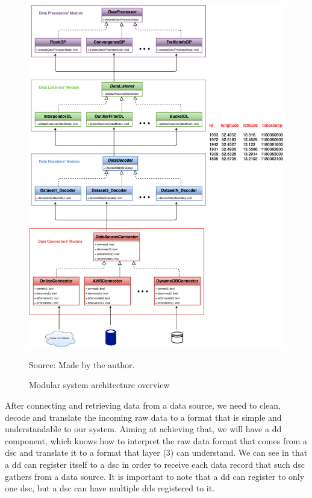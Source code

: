 \begin{figure}[h!]
    \centering
    \caption{Modular system architecture overview}
    \centerline{\includegraphics[width=\linewidth]{images/architecture.eps}}
    \footnotesize{Source: Made by the author.}
    \label{fig:architecture}
\end{figure}

After connecting and retrieving data from a data source, we need to clean, decode and translate the incoming raw data to
a format that is simple and understandable to our system. Aiming at achieving that, we will have a \ac{dd} component,
which knows how to interpret the raw data format that comes from a \ac{dsc} and translate it to a format that layer (3)
can understand. We can see in  that a \ac{dd} can register itself to a \ac{dsc} in order to
receive each data record that such \ac{dsc} gathers from a data source. It is important to note that a \ac{dd} can
register to only one \ac{dsc}, but a \ac{dsc} can have multiple \acp{dd} registered to it.

